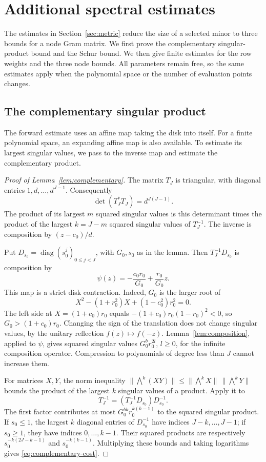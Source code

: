 \section{Additional spectral estimates}\label{app:spectral}\label{app:metric}
The estimates in Section~\ref{sec:metric} reduce the size of a selected
minor to three bounds for a node Gram matrix. We first prove the
complementary singular-product bound and the Schur bound. We then give
finite estimates for the row weights and the three node bounds. All
parameters remain free, so the same estimates apply when the polynomial
space or the number of evaluation points changes.

\subsection{The complementary singular product}\label{supp:complementary}
The forward estimate uses an affine map taking the disk into itself.
For a finite polynomial space, an expanding affine map is also available.
To estimate its largest singular values, we pass to the inverse map and
estimate the complementary product.

\begin{proof}[Proof of Lemma~\ref{lem:complementary}]
The matrix $T_J$ is triangular, with diagonal entries $1,d,\ldots,d^{J-1}$.
Consequently
\[
 \det(T_J^*T_J)=d^{J(J-1)}.
\]
The product of its largest $m$ squared singular values is this determinant
times the product of the largest $k=J-m$ squared singular values of
$T_J^{-1}$. The inverse is composition by $(z-c_0)/d$.

Put $D_{s_0}=\operatorname{diag}(s_0^j)_{0\leq j<J}$, with $G_0,s_0$
as in the lemma. Then $T_J^{-1}D_{s_0}$ is composition by
\[
 \psi(z)=-\frac{c_0r_0}{G_0}+\frac{r_0}{G_0}z.
\]
This map is a strict disk contraction. Indeed, $G_0$ is the larger root
of
\[
 X^2-(1+r_0^2)X+(1-c_0^2)r_0^2=0.
\]
The left side at $X=(1+c_0)r_0$ equals
$-(1+c_0)r_0(1-r_0)^2<0$, so $G_0>(1+c_0)r_0$.
Changing the sign of the translation does not change singular values,
by the unitary reflection $f(z)\mapsto f(-z)$.
Lemma~\ref{lem:composition}, applied to $\psi$, gives squared singular
values $G_0^b r_0^{2l}$, $l\geq0$, for the infinite composition operator.
Compression to polynomials of degree less than $J$ cannot increase them.

For matrices $X,Y$, the norm inequality
$\|\bigwedge^k(XY)\|\leq
\|\bigwedge^kX\|\,\|\bigwedge^kY\|$ bounds the product of the largest
$k$ singular values of a product. Apply it to
\[
 T_J^{-1}=(T_J^{-1}D_{s_0})D_{s_0}^{-1}.
\]
The first factor contributes at most $G_0^{bk}r_0^{k(k-1)}$ to the
squared singular product. If $s_0\leq1$, the largest $k$ diagonal
entries of $D_{s_0}^{-1}$ have indices $J-k,\ldots,J-1$; if $s_0\geq1$,
they have indices $0,\ldots,k-1$. Their squared products are respectively
$s_0^{-k(2J-k-1)}$ and $s_0^{-k(k-1)}$. Multiplying these bounds and
taking logarithms gives \eqref{eq:complementary-cost}.
\end{proof}

